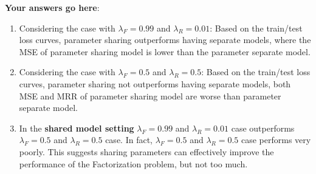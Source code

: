 \documentclass[12pt]{article}
\begin{document}
\newpage

\noindent\textbf{Your answers go here}:

\begin{enumerate}
    \item Considering the case with $\lambda_F=0.99$ and $\lambda_R=0.01$: Based on the train/test loss curves, parameter sharing outperforms having separate models, where the MSE of parameter sharing model is lower than the parameter separate model.

    \item Considering the case with $\lambda_F=0.5$ and $\lambda_R=0.5$:  Based on the train/test loss curves, parameter sharing not outperforms having separate models, both MSE and MRR of parameter sharing model are worse than parameter separate model.

    \item In the \textbf{shared model setting} $\lambda_F=0.99$ and $\lambda_R=0.01$ case outperforms $\lambda_F=0.5$ and $\lambda_R=0.5$ case. In fact, $\lambda_F=0.5$ and $\lambda_R=0.5$ case performs very poorly. 
    This suggests sharing parameters can effectively improve the performance of the Factorization problem, but not too much.

\end{enumerate}

\newpage


\end{document}
